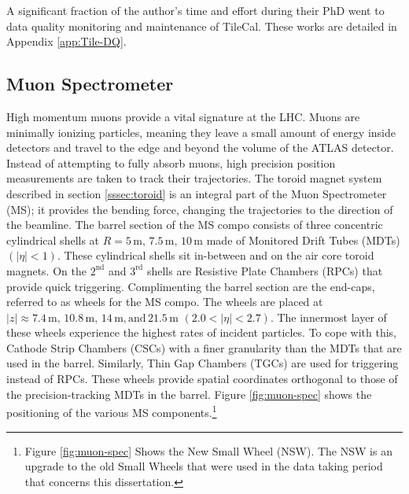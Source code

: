 		A significant fraction of the author's time and effort during their PhD went to data quality monitoring and maintenance of TileCal. These works are detailed in Appendix \ref{app:Tile-DQ}.

	\subsection{Muon Spectrometer}\label{ssec:muon-system}
	High momentum muons provide a vital signature at the LHC. Muons are minimally ionizing particles, meaning they leave a small amount of energy inside detectors and travel to the edge and beyond the volume of the ATLAS detector. Instead of attempting to fully absorb muons, high precision position measurements are taken to track their trajectories. The toroid magnet system described in section \ref{sssec:toroid} is an integral part of the Muon Spectrometer (MS); it provides the bending force, changing the trajectories to the direction of the beamline. The barrel section of the MS compo consists of three concentric cylindrical shells at $R=5 \, \mathrm{ m, }\, 7.5 \, \mathrm{ m, } \,  10 \, \mathrm{ m}$ made of Monitored Drift Tubes (MDTs) $(|\eta|<1)$. \cite{ATLAS-muon} These cylindrical shells sit in-between and on the air core toroid magnets. On the $2^{\mathrm{nd}}$ and $3^{\mathrm{rd}}$ shells are Resistive Plate Chambers (RPCs) that provide quick triggering. Complimenting the barrel section are the end-caps, referred to as wheels for the MS compo. The wheels are placed at $|z|\approx 7.4 \, \mathrm{ m, } \, 10.8 \, \mathrm{ m, } \, 14 \, \mathrm{ m, and} \,21.5 \,\mathrm{ m }$ $(2.0 < |\eta| < 2.7)$. The innermost layer of these wheels experience the highest rates of incident particles. To cope with this, Cathode Strip Chambers (CSCs) with a finer granularity than the MDTs that are used in the barrel. Similarly, Thin Gap Chambers (TGCs) are used for triggering instead of RPCs. These wheels provide spatial coordinates orthogonal to those of the precision-tracking MDTs in the barrel. Figure \ref{fig:muon-spec} shows the positioning of the various MS components.\footnote{Figure \ref{fig:muon-spec} Shows the New Small Wheel (NSW). The NSW is an upgrade to the old Small Wheels that were used in the data taking period that concerns this dissertation.}


